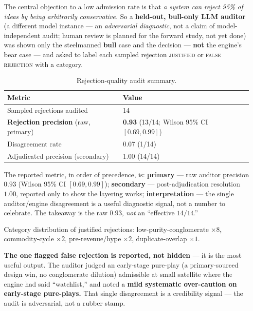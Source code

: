 \documentclass[11pt]{article}
\begin{document}
The central objection to a low admission rate is that \emph{a system can
reject 95\% of ideas by being arbitrarily conservative.}
So a \textbf{held-out, bull-only LLM auditor} (a different model instance --- an
\emph{adversarial diagnostic}, not a claim of model-independent audit; human review is
planned for the forward study, not yet done) was shown only the steelmanned
\textbf{bull} case and the decision --- \textbf{not} the engine's bear case
--- and asked to label each sampled rejection \textsc{justified} or
\textsc{false rejection} with a category.

\begin{table}[h]
\centering
\begin{tabular}{ll}
\toprule
\textbf{Metric} & \textbf{Value} \\
\midrule
Sampled rejections audited & 14 \\
\textbf{Rejection precision} (raw, primary) & \textbf{0.93} (13/14; Wilson 95\% CI $[0.69, 0.99]$) \\
Disagreement rate & 0.07 (1/14) \\
Adjudicated precision (secondary) & 1.00 (14/14) \\
\bottomrule
\end{tabular}
\caption{Rejection-quality audit summary.}
\end{table}

\noindent The reported metric, in order of precedence, is: \textbf{primary} --- raw auditor
precision $0.93$ (Wilson 95\% CI $[0.69, 0.99]$); \textbf{secondary} --- post-adjudication
resolution $1.00$, reported only to show the layering works; \textbf{interpretation} --- the single
auditor/engine disagreement is a useful diagnostic signal, not a number to celebrate. The takeaway
is the raw $0.93$, \emph{not} an ``effective $14/14$.''

Category distribution of justified rejections: low-purity-conglomerate
$\times 8$, commodity-cycle $\times 2$, pre-revenue/hype $\times 2$,
duplicate-overlap $\times 1$.

\textbf{The one flagged false rejection is reported, not hidden} --- it is the
most useful output.
The auditor judged an early-stage pure-play (a primary-sourced design win,
no conglomerate dilution) admissible at small satellite where the engine had
said ``watchlist,'' and noted a \textbf{mild systematic over-caution on
early-stage pure-plays.}
That single disagreement is a credibility signal --- the audit is adversarial,
not a rubber stamp.
\end{document}
